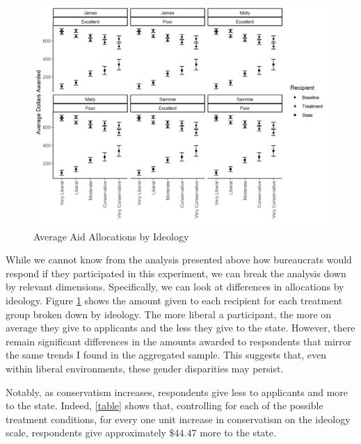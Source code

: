 \documentclass[12pt]{article}%
\begin{document}
\begin{doublespace}
\begin{figure}[H]
	\centering
	\includegraphics[scale=.8]{figs/robust_result_ideo.png}
	\caption{Average Aid Allocations by Ideology}
	\label{ideology}
\end{figure}


While we cannot know from the analysis presented above how bureaucrats would respond if they participated in this experiment, we can break the analysis down by relevant dimensions. Specifically, we can look at differences in allocations by ideology. Figure \ref{ideology} shows the amount given to each recipient for each treatment group broken down by ideology. The more liberal a participant, the more on average they give to applicants and the less they give to the state. However, there remain significant differences in the amounts awarded to respondents that mirror the same trends I found in the aggregated sample. This suggests that, even within liberal environments, these gender disparities may persist.

Notably, as conservatism increases, respondents give less to applicants and more to the state. Indeed, \ref{table} shows that, controlling for each of the possible treatment conditions, for every one unit increase in conservatism on the ideology scale, respondents give approximately $\$44.47$ more to the state.


\end{doublespace}
\end{document}
